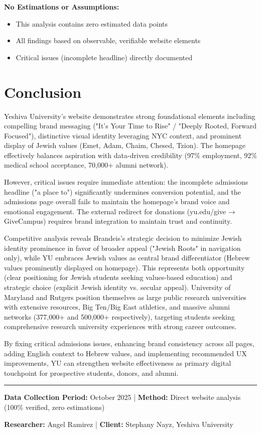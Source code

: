 \documentclass[12pt,letterpaper]{article}
\begin{document}
\textbf{No Estimations or Assumptions:}
\begin{itemize}[leftmargin=*]
    \item This analysis contains zero estimated data points
    \item All findings based on observable, verifiable website elements
    \item Critical issues (incomplete headline) directly documented
\end{itemize}

\section{Conclusion}

Yeshiva University's website demonstrates strong foundational elements including compelling brand messaging ("It's Your Time to Rise" / "Deeply Rooted, Forward Focused"), distinctive visual identity leveraging NYC context, and prominent display of Jewish values (Emet, Adam, Chaim, Chesed, Tzion). The homepage effectively balances aspiration with data-driven credibility (97\% employment, 92\% medical school acceptance, 70,000+ alumni network).

However, critical issues require immediate attention: the incomplete admissions headline ("a place to") significantly undermines conversion potential, and the admissions page overall fails to maintain the homepage's brand voice and emotional engagement. The external redirect for donations (yu.edu/give → GiveCampus) requires brand integration to maintain trust and continuity.

Competitive analysis reveals Brandeis's strategic decision to minimize Jewish identity prominence in favor of broader appeal ("Jewish Roots" in navigation only), while YU embraces Jewish values as central brand differentiator (Hebrew values prominently displayed on homepage). This represents both opportunity (clear positioning for Jewish students seeking values-based education) and strategic choice (explicit Jewish identity vs. secular appeal). University of Maryland and Rutgers position themselves as large public research universities with extensive resources, Big Ten/Big East athletics, and massive alumni networks (377,000+ and 500,000+ respectively), targeting students seeking comprehensive research university experiences with strong career outcomes.

By fixing critical admissions issues, enhancing brand consistency across all pages, adding English context to Hebrew values, and implementing recommended UX improvements, YU can strengthen website effectiveness as primary digital touchpoint for prospective students, donors, and alumni.

\vspace{0.5cm}

\noindent\rule{\textwidth}{0.4pt}

\textbf{Data Collection Period:} October 2025 | \textbf{Method:} Direct website analysis (100\% verified, zero estimations)

\textbf{Researcher:} Angel Ramirez | \textbf{Client:} Stephany Nayz, Yeshiva University
\end{document}
